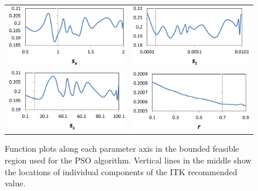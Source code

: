 \documentclass[]{spie}  %
\begin{document}
\begin{figure}[tb!]
\begin{center}
\begin{tabular}{cc}
\includegraphics[width=2.5in]{cf_plot_p0} &
\includegraphics[width=2.5in]{cf_plot_p1} \\
\includegraphics[width=2.5in]{cf_plot_p2} &
\includegraphics[width=2.5in]{cf_plot_p3} \\
\end{tabular}
\end{center}
\caption{Function plots along each parameter axis in the bounded feasible region used for the PSO algorithm. Vertical lines in the middle show the locations of individual components of the ITK recommended value.}
\label{fig:f_plots}
\end{figure}
\end{document}
